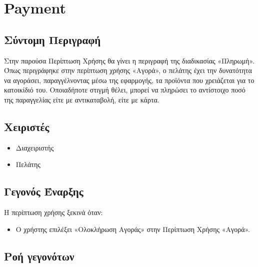 \documentclass[12pt,a4paper,twoside]{book}
\begin{document}
\section{Payment} %

\subsection{Σύντομη Περιγραφή}
Στην παρούσα Περίπτωση Χρήσης θα γίνει η περιγραφή της διαδικασίας «Πληρωμή». Όπως περιγράφηκε στην περίπτωση χρήσης «Αγορά», ο πελάτης έχει την δυνατότητα να αγοράσει, παραγγέλνοντας μέσω της εφαρμογής, τα προϊόντα που χρειάζεται για το κατοικίδιό του. Οποιαδήποτε στιγμή θέλει, μπορεί να πληρώσει το αντίστοιχο ποσό της παραγγελίας είτε με αντικαταβολή, είτε με κάρτα. %

\subsection{Χειριστές}
\begin{itemize}
  \item Διαχειριστής
  \item Πελάτης
\end{itemize}

\subsection{Γεγονός Έναρξης}
Η περίπτωση χρήσης ξεκινά όταν:
\begin{itemize}
  \item Ο χρήστης επιλέξει «Ολοκλήρωση Αγοράς» στην Περίπτωση Χρήσης «Αγορά». %
\end{itemize}

\subsection{Ροή γεγονότων}
\end{document}
